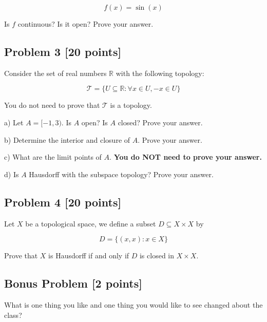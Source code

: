 \documentclass{article}
\newcommand{\jump}{\vspace{0.5 in}}
\newcommand{\bigjump}{\vspace{1.7 in}}
\begin{document}
$$ f(x) = \sin (x) $$

Is $f$ continuous? Is it open? Prove your answer.

\jump

\newpage

\subsection*{Problem 3 [20 points]} Consider the set of real numbers $\mathbb{R}$ with the following topology:

$$ \mathcal{T} = \{ U \subseteq \mathbb{R} : \forall x \in U, -x \in U \} $$

You do not need to prove that $\mathcal{T}$ is a topology.

\jump

a) Let $A = [-1,3)$. Is $A$ open? Is $A$ closed? Prove your answer.

\bigjump

b) Determine the interior and closure of $A$. Prove your answer.

\bigjump

c) What are the limit points of $A$. \textbf{You do NOT need to prove your answer.}

\bigjump

d) Is $A$ Hausdorff with the subspace topology? Prove your answer.


\newpage
\subsection*{Problem 4 [20 points]}
Let $X$ be a topological space, we define a subset $D \subseteq X \times X$ by 

$$ D = \{(x,x) : x \in X \} $$

\vspace{0.15 cm}

Prove that $X$ is Hausdorff if and only if $D$ is closed in $X \times X$.

\vspace{15 cm}

\subsection*{Bonus Problem [2 points]}

What is one thing you like and one thing you would like to see changed about the class?
\end{document}
